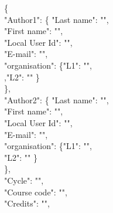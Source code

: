 {     %
    \thispagestyle{empty}
    \sffamily\tiny
    \begin{flushleft}
    \{\\
        "Author1": \{ \ifx\@authorsLastname\@empty\relax
     \else
     "Last name": "\@authorsLastname",\\
     \fi
     \ifx\@authorsFirstname\@empty\relax
     \else
     "First name": "\@authorsFirstname",\\
     \fi
     \ifx\@kthid\@empty\relax
     \else
     "Local User Id": "\@kthid",\\
     \fi
     \ifx\@email\@empty\relax
     \else
     "E-mail": "\@email",\\
     \fi
     \ifx\@authorsSchool\@empty\relax
     \else
     "organisation": \{"L1": "\@authorsSchool",\\
     \ifx\@authorsDepartment\@empty\relax
     \else
     ,"L2": "\@authorsDepartment"
     \fi
     \}\\
     \fi
    \},\\
    \ifx\@secondAuthorsLastname\@empty\relax
    \else
        "Author2": \{ \ifx\@secondAuthorsLastname\@empty\relax
            \else
        "Last name": "\@secondAuthorsLastname",\\
        \fi
        \ifx\@secondAuthorsFirstname\@empty\relax
            \else
        "First name": "\@secondAuthorsFirstname",\\
        \fi
        \ifx\@secondkthid\@empty\relax
            \else
        "Local User Id": "\@secondkthid",\\
        \fi
        \ifx\@secondemail\@empty\relax
            \else
        "E-mail": "\@secondemail",\\
        \fi
        \ifx\@secondAuthorsSchool\@empty\relax
        \else
        "organisation": \{"L1": "\@secondAuthorsSchool",\\
        \ifx\@secondAuthorsDepartment\@empty\relax
        \else
        "L2": "\@secondAuthorsDepartment"
        \fi
        \}\\
		\fi
    \},\\
    \fi
    \ifx\@courseCycle\@empty\relax
    \else
    "Cycle": "\@courseCycle",\\
    \fi
    \ifx\@courseCode\@empty\relax
    \else
    "Course code": "\@courseCode",\\
    \fi
    \ifx\@courseCredits\@empty\relax
    \else
    "Credits": "\@courseCredits",\\
     \fi


\end{flushleft}}
